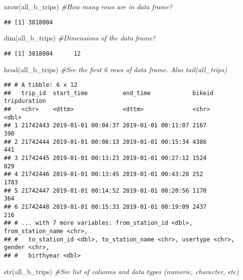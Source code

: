 \documentclass[
]{article}
\newenvironment{Shaded}{\begin{snugshade}}{\end{snugshade}}
\newcommand{\CommentTok}[1]{\textcolor[rgb]{0.56,0.35,0.01}{\textit{#1}}}
\newcommand{\FunctionTok}[1]{\textcolor[rgb]{0.00,0.00,0.00}{#1}}
\newcommand{\NormalTok}[1]{#1}
\begin{document}
\begin{Shaded}
\begin{Highlighting}[]
\FunctionTok{nrow}\NormalTok{(all\_b\_trips)  }\CommentTok{\#How many rows are in data frame?}
\end{Highlighting}
\end{Shaded}

\begin{verbatim}
## [1] 3818004
\end{verbatim}

\begin{Shaded}
\begin{Highlighting}[]
\FunctionTok{dim}\NormalTok{(all\_b\_trips)  }\CommentTok{\#Dimensions of the data frame?}
\end{Highlighting}
\end{Shaded}

\begin{verbatim}
## [1] 3818004      12
\end{verbatim}

\begin{Shaded}
\begin{Highlighting}[]
\FunctionTok{head}\NormalTok{(all\_b\_trips)  }\CommentTok{\#See the first 6 rows of data frame.  Also tail(all\_trips)}
\end{Highlighting}
\end{Shaded}

\begin{verbatim}
## # A tibble: 6 x 12
##   trip_id  start_time          end_time            bikeid tripduration
##   <chr>    <dttm>              <dttm>              <chr>         <dbl>
## 1 21742443 2019-01-01 00:04:37 2019-01-01 00:11:07 2167            390
## 2 21742444 2019-01-01 00:08:13 2019-01-01 00:15:34 4386            441
## 3 21742445 2019-01-01 00:13:23 2019-01-01 00:27:12 1524            829
## 4 21742446 2019-01-01 00:13:45 2019-01-01 00:43:28 252            1783
## 5 21742447 2019-01-01 00:14:52 2019-01-01 00:20:56 1170            364
## 6 21742448 2019-01-01 00:15:33 2019-01-01 00:19:09 2437            216
## # ... with 7 more variables: from_station_id <dbl>, from_station_name <chr>,
## #   to_station_id <dbl>, to_station_name <chr>, usertype <chr>, gender <chr>,
## #   birthyear <dbl>
\end{verbatim}

\begin{Shaded}
\begin{Highlighting}[]
\FunctionTok{str}\NormalTok{(all\_b\_trips)  }\CommentTok{\#See list of columns and data types (numeric, character, etc)}
\end{Highlighting}
\end{Shaded}
\end{document}
